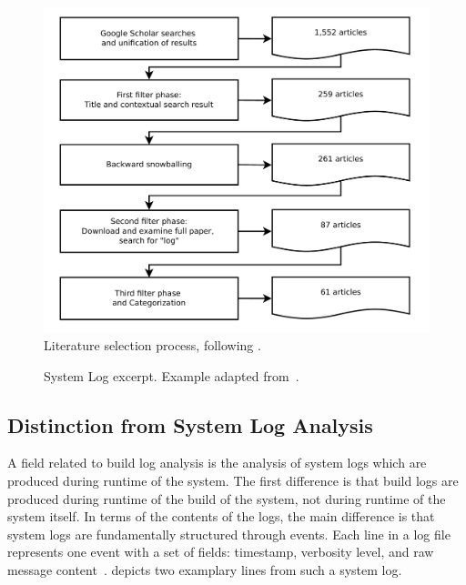 \begin{figure}[tb]
	\centering
	\includegraphics[width=\columnwidth, clip]{img/lit_survey.pdf}
	\caption{Literature selection process, following
	\cite{petersen2015guidelines}.}
	\label{fig:lit-survey}
\end{figure}


\begin{figure}[b]
  \centering
  
  \caption{System Log excerpt.
Example adapted from~\cite{he2017towards}.}
  \label{lst:system-log}
\end{figure}

\subsection{Distinction from System Log Analysis}
\label{sec:system-log-analysis}
A field related to build log analysis is the analysis of system
logs which are produced during runtime of the system.
The first difference is that build logs are produced during runtime
of the build of the system, not during runtime of the system itself.
In terms of the contents of the logs, the main difference is that system
logs are fundamentally structured
through events.
Each line in a log file represents one event with a
set of fields: timestamp, verbosity level, and raw message
content~\cite{he2017towards}.
 depicts two
examplary lines from such a system log.

